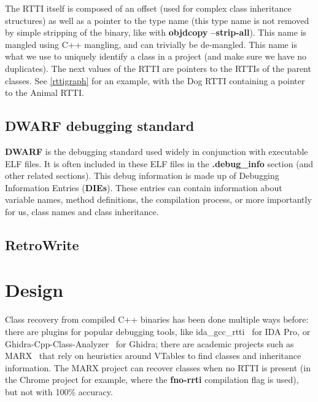 \documentclass[a4paper,11pt,oneside]{report}
\begin{document}
The RTTI itself is composed of an offset (used for complex class inheritance structures) as well as a pointer to the type name (this type name is not removed by simple stripping of the binary, like with \textbf{objdcopy --strip-all}).
This name is mangled using C++ mangling, and can trivially be de-mangled. This name is what we use to uniquely identify a class in a project (and make sure we have no duplicates).
The next values of the RTTI are pointers to the RTTIs of the parent classes. See \autoref{rttigraph} for an example, with the Dog RTTI containing a pointer to the Animal RTTI.

\section{DWARF debugging standard}

\textbf{DWARF} is the debugging standard used widely in conjunction with executable ELF files.
It is often included in these ELF files in the \textbf{.debug\_info} section (and other related sections).
This debug information is made up of Debugging Information Entries (\textbf{DIEs}).
These entries can contain information about variable names, method definitions, the compilation process, or more importantly for us, class names and class inheritance.


\section{RetroWrite}



\chapter{Design}



Class recovery from compiled C++ binaries has been done multiple ways before:
there are plugins for popular debugging tools, like ida\_gcc\_rtti~\cite{idagccrtti} for IDA Pro,
or Ghidra-Cpp-Class-Analyzer~\cite{ghidracppclassanalyzer} for Ghidra;
there are academic projects such as MARX~\cite{marx} that rely on heuristics around VTables to find classes and inheritance information.
The MARX project can recover classes when no RTTI is present (in the Chrome project for example, where the \textbf{fno-rrti} compilation flag is used), but not with 100\% accuracy.
\end{document}

